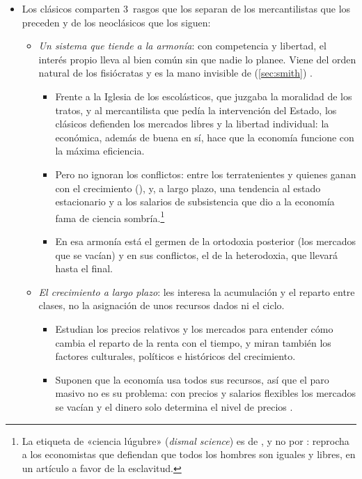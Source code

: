 \documentclass[11pt]{article}
\begin{document}
\begin{itemize}
\item Los clásicos comparten 3~rasgos que los separan de los mercantilistas que los preceden y de los neoclásicos que los siguen\nocite{LandrethColander2006Historia}:
  \begin{itemize}
  \item \emph{Un sistema que tiende a la armonía}: con competencia y libertad, el interés propio lleva al bien común sin que nadie lo planee. Viene del orden natural de los fisiócratas y es la mano invisible de  (\ref{sec:smith}) .
    \begin{itemize}
    \item Frente a la Iglesia de los escolásticos, que juzgaba la moralidad de los tratos, y al mercantilista que pedía la intervención del Estado, los clásicos defienden los mercados libres y la libertad individual: la económica, además de buena en sí, hace que la economía funcione con la máxima eficiencia.
    \item Pero no ignoran los conflictos: entre los terratenientes y quienes ganan con el crecimiento (), y, a largo plazo, una tendencia al estado estacionario y a los salarios de subsistencia que dio a la economía fama de ciencia sombría.\footnote{La etiqueta de «ciencia lúgubre» (\emph{dismal science}) es de \textcite{Carlyle1849Occasional}, y no por :  reprocha a los economistas que defiendan que todos los hombres son iguales y libres, en un artículo a favor de la esclavitud.}
    \item En esa armonía está el germen de la ortodoxia posterior (los mercados que se vacían) y en sus conflictos, el de la heterodoxia, que llevará  hasta el final.
    \end{itemize}
  \item \emph{El crecimiento a largo plazo}: les interesa la acumulación y el reparto entre clases, no la asignación de unos recursos dados ni el ciclo.
    \begin{itemize}
    \item Estudian los precios relativos y los mercados para entender cómo cambia el reparto de la renta con el tiempo, y miran también los factores culturales, políticos e históricos del crecimiento.
    \item Suponen que la economía usa todos sus recursos, así que el paro masivo no es su problema: con precios y salarios flexibles los mercados se vacían y el dinero solo determina el nivel de precios .

\end{itemize}
\end{itemize}
\end{itemize}
\end{document}
